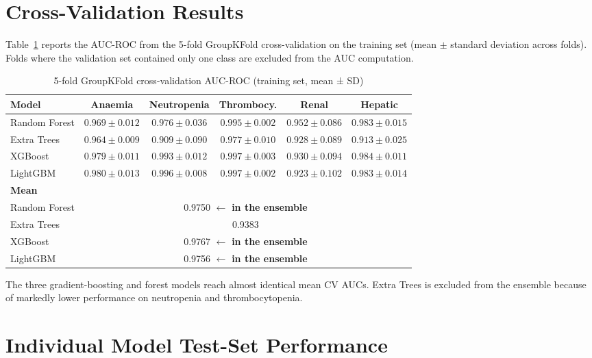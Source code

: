 \documentclass[12pt,a4paper]{report}
\begin{document}
\section{Cross-Validation Results}

Table~\ref{tab:cv} reports the AUC-ROC from the 5-fold GroupKFold cross-validation on the training set (mean $\pm$ standard deviation across folds). Folds where the validation set contained only one class are excluded from the AUC computation.

\begin{table}[H]
\centering
\caption{5-fold GroupKFold cross-validation AUC-ROC (training set, mean ± SD)}
\label{tab:cv}
\setlength{\tabcolsep}{4pt}
\begin{tabular}{lccccc}
\toprule
\textbf{Model} & \textbf{Anaemia} & \textbf{Neutropenia} & \textbf{Thrombocy.} & \textbf{Renal} & \textbf{Hepatic} \\
\midrule
Random Forest & $0.969 \pm 0.012$ & $0.976 \pm 0.036$ & $0.995 \pm 0.002$ & $0.952 \pm 0.086$ & $0.983 \pm 0.015$ \\
Extra Trees   & $0.964 \pm 0.009$ & $0.909 \pm 0.090$ & $0.977 \pm 0.010$ & $0.928 \pm 0.089$ & $0.913 \pm 0.025$ \\
XGBoost       & $0.979 \pm 0.011$ & $0.993 \pm 0.012$ & $0.997 \pm 0.003$ & $0.930 \pm 0.094$ & $0.984 \pm 0.011$ \\
LightGBM      & $0.980 \pm 0.013$ & $0.996 \pm 0.008$ & $0.997 \pm 0.002$ & $0.923 \pm 0.102$ & $0.983 \pm 0.014$ \\
\midrule
\textbf{Mean} & & & & & \\
Random Forest & \multicolumn{5}{c}{0.9750 $\leftarrow$ \textbf{in the ensemble}} \\
Extra Trees   & \multicolumn{5}{c}{0.9383} \\
XGBoost       & \multicolumn{5}{c}{0.9767 $\leftarrow$ \textbf{in the ensemble}} \\
LightGBM      & \multicolumn{5}{c}{0.9756 $\leftarrow$ \textbf{in the ensemble}} \\
\bottomrule
\end{tabular}
\end{table}

The three gradient-boosting and forest models reach almost identical mean CV AUCs. Extra Trees is excluded from the ensemble because of markedly lower performance on neutropenia and thrombocytopenia.

\section{Individual Model Test-Set Performance}
\end{document}
